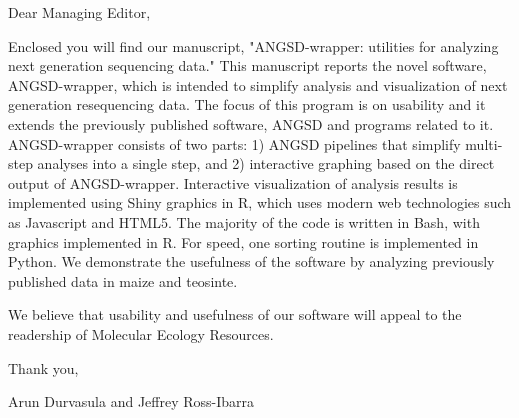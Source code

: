 Dear Managing Editor,

Enclosed you will find our manuscript, "ANGSD-wrapper: utilities for analyzing next generation sequencing data."
This manuscript reports the novel software, ANGSD-wrapper, which is intended to simplify analysis and visualization of next generation resequencing data.
The focus of this program is on usability and it extends the previously published software, ANGSD and programs related to it. 
ANGSD-wrapper consists of two parts: 1) ANGSD pipelines that simplify multi-step analyses into a single step, and 2) interactive graphing based on the direct output of ANGSD-wrapper. 
Interactive visualization of analysis results is implemented using Shiny graphics in R, which uses modern web technologies such as Javascript and HTML5. 
The majority of the code is written in Bash, with graphics implemented in R. For speed, one sorting routine is implemented in Python.
We demonstrate the usefulness of the software by analyzing previously published data in maize and teosinte. 

We believe that usability and usefulness of our software will appeal to the readership of Molecular Ecology Resources.

Thank you,

Arun Durvasula and Jeffrey Ross-Ibarra